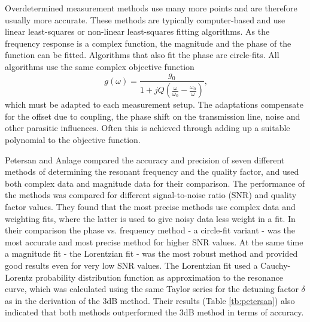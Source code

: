 Overdetermined measurement methods use many more points and are therefore usually more accurate. These methods are typically computer-based and use linear least-squares or non-linear least-squares fitting algorithms. As the frequency response is a complex function, the magnitude and the phase of the function can be fitted. Algorithms that also fit the phase are circle-fits. All algorithms use the same complex objective function
\begin{equation}
g(\omega)=\frac{g_0}{1+jQ(\frac{\omega}{\omega_0}-\frac{\omega_0}{\omega})}\text{,}
\end{equation}
which must be adapted to each measurement setup. The adaptations compensate for the offset due to coupling, the phase shift on the transmission line, noise and other parasitic influences. Often this is achieved through adding up a suitable polynomial to the objective function.

Petersan and Anlage \cite{petersan} compared the accuracy and precision of seven different methods of determining the resonant frequency and the quality factor, and used both complex data and magnitude data for their comparison. The performance of the methods was compared for different signal-to-noise ratio (SNR) and quality factor values. They found that the most precise methods use complex data and weighting fits, where the latter is used to give noisy data less weight in a fit. In their comparison the phase vs. frequency method - a circle-fit variant - was the most accurate and most precise method for higher SNR values. At the same time a magnitude fit - the Lorentzian fit \cite{bevington} - was the most robust method and provided good results even for very low SNR values. The Lorentzian fit used a Cauchy-Lorentz probability distribution function as approximation to the resonance curve, which was calculated using the same Taylor series for the detuning factor $\delta$ as in the derivation of the 3dB method. Their results (Table \ref{tb:petersan}) also indicated that both methods outperformed the 3dB method in terms of accuracy.

